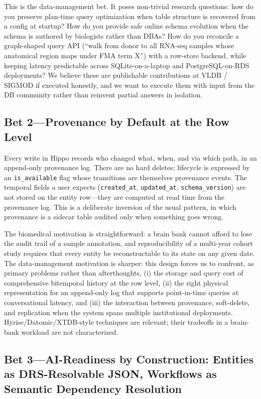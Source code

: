 \documentclass[sigconf, nonacm]{acmart}
\begin{document}
This is the data-management bet. It poses non-trivial research questions: how do you preserve plan-time query optimization when table structure is recovered from a config at startup? How do you provide safe online schema evolution when the schema is authored by biologists rather than DBAs? How do you reconcile a graph-shaped query API (``walk from donor to all RNA-seq samples whose anatomical region maps under FMA term X'') with a row-store backend, while keeping latency predictable across SQLite-on-a-laptop and PostgreSQL-on-RDS deployments? We believe these are publishable contributions at VLDB / SIGMOD if executed honestly, and we want to execute them with input from the DB community rather than reinvent partial answers in isolation.

\subsection{Bet 2---Provenance by Default at the Row Level}

Every write in Hippo records who changed what, when, and via which path, in an append-only provenance log. There are no hard deletes; lifecycle is expressed by an \verb|is_available| flag whose transitions are themselves provenance events. The temporal fields a user expects (\verb|created_at|, \verb|updated_at|, \verb|schema_version|) are not stored on the entity row---they are computed at read time from the provenance log. This is a deliberate inversion of the usual pattern, in which provenance is a sidecar table audited only when something goes wrong.

The biomedical motivation is straightforward: a brain bank cannot afford to lose the audit trail of a sample annotation, and reproducibility of a multi-year cohort study requires that every entity be reconstructable to its state on any given date. The data-management motivation is sharper: this design forces us to confront, as primary problems rather than afterthoughts, (i) the storage and query cost of comprehensive bitemporal history at the row level, (ii) the right physical representation for an append-only log that supports point-in-time queries at conversational latency, and (iii) the interaction between provenance, soft-delete, and replication when the system spans multiple institutional deployments. Hyrise/Datomic/XTDB-style techniques are relevant; their tradeoffs in a brain-bank workload are not characterized.

\subsection{Bet 3---AI-Readiness by Construction: Entities as DRS-Resolvable JSON, Workflows as Semantic Dependency Resolution}
\end{document}
